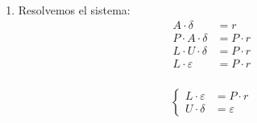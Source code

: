 \documentclass[../main.tex]{subfiles}
\begin{document}
\begin{example}
\begin{enumerate}
                \item
                    Resolvemos el sistema:
                    \begin{equation}
                        \begin{split}
                            A \cdot \delta &= r\\
                            P \cdot A \cdot \delta &= P \cdot r\\
                            L \cdot U \cdot \delta &= P \cdot r\\
                            L \cdot \varepsilon &= P \cdot r\\
                        \end{split}
                    \end{equation}

                    \begin{equation}
                        \begin{split}
                            \left\lbrace
                            \begin{array}{ll}
                                L \cdot \varepsilon &= P \cdot r\\
                                U \cdot \delta &= \varepsilon
                            \end{array}
                            \right.
                        \end{split}
                    \end{equation}
                

\end{enumerate}
\end{example}
\end{document}
